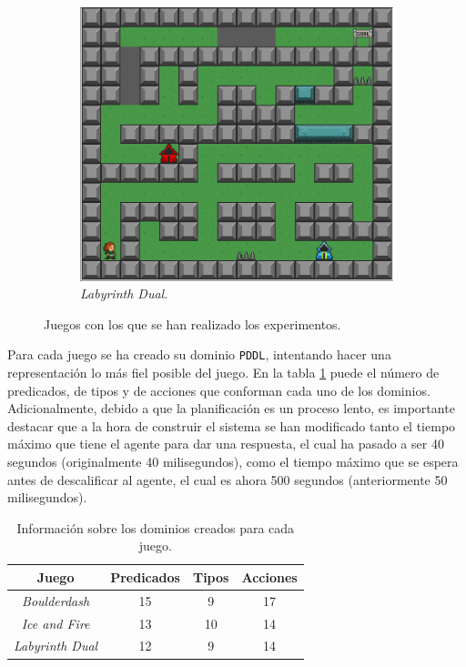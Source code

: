 \begin{figure}[H]
\begin{subfigure}[t]{0.5\textwidth}
        \includegraphics[scale=0.25]{img/CH08/labyrinth_dual.png}
        \caption{\textit{Labyrinth Dual}.}
        \label{fig:labyrinth_dual}
    \end{subfigure}
    \caption{Juegos con los que se han realizado los experimentos.}
    \label{fig:games}
\end{figure}

Para cada juego se ha creado su dominio \texttt{PDDL}, intentando hacer una representación lo más
fiel posible del juego. En la tabla \ref{tab:info-domains} puede el número de predicados, de tipos y
de acciones que conforman cada uno de los dominios. Adicionalmente, debido a que la planificación es
un proceso lento, es importante destacar que a la hora de construir el sistema se han modificado tanto el
tiempo máximo que tiene el agente para dar una respuesta, el cual ha pasado a ser 40 segundos (originalmente 40
milisegundos), como el tiempo máximo que se espera antes de descalificar al agente, el cual es ahora
500 segundos (anteriormente 50 milisegundos).

\begin{table}[H]
\centering
\begin{tabular}{|c|ccc|}
\hline
\textbf{Juego} & \textbf{Predicados} & \textbf{Tipos} & \textbf{Acciones} \\ \hline
\textit{Boulderdash} & 15 & 9 & 17 \\ \hline
\textit{Ice and Fire} & 13 & 10 & 14 \\ \hline
\textit{Labyrinth Dual} & 12 & 9 & 14 \\ \hline
\end{tabular}
\caption{Información sobre los dominios creados para cada juego.}
\label{tab:info-domains}
\end{table}

